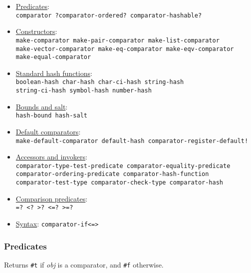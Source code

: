 \begin{itemize}
\item
  \protect\hyperlink{Predicates}{Predicates}:\\
  \texttt{comparator ?comparator-ordered? comparator-hashable?}
\item
  \protect\hyperlink{Constructors}{Constructors}:\\
  \texttt{make-comparator make-pair-comparator make-list-comparator}\\
  \texttt{make-vector-comparator make-eq-comparator make-eqv-comparator}\\ 
  \texttt{make-equal-comparator}
\item
  \protect\hyperlink{Hashfunctions}{Standard hash functions}:\\
  \texttt{boolean-hash char-hash char-ci-hash string-hash}\\ 
  \texttt{string-ci-hash symbol-hash number-hash}
\item
  \protect\hyperlink{Boundsandsalt}{Bounds and salt}:\\
  \texttt{hash-bound hash-salt}
\item
  \protect\hyperlink{Defaultcomparators}{Default comparators}:\\
  \texttt{make-default-comparator default-hash comparator-register-default!}
\item
  \protect\hyperlink{Accessorsandinvokers}{Accessors and invokers}:\\
  \texttt{comparator-type-test-predicate
    comparator-equality-predicate}\\ 
  \texttt{comparator-ordering-predicate comparator-hash-function}\\
  \texttt{comparator-test-type comparator-check-type comparator-hash}
\item
  \protect\hyperlink{Comparisonpredicates}{Comparison predicates}:\\
  \texttt{=?\ <?\ >?\ <=?\ >=?}
\item
  \protect\hyperlink{Syntax}{Syntax}:
  \texttt{comparator-if<=>}
\end{itemize}

\subsubsection{Predicates}

\begin{entry}{%
  }

  Returns \texttt{\#t} if \emph{obj} is a comparator, and \texttt{\#f}
  otherwise.
\end{entry}

